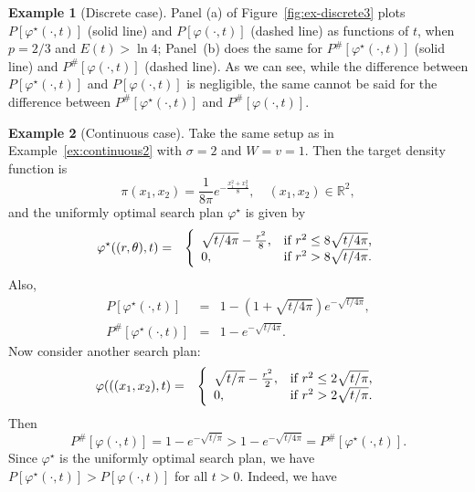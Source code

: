 \documentclass[12pt]{article}
\theoremstyle{plain}
\theoremstyle{definition}
\newtheorem{example}{Example}%
\theoremstyle{remark}
\begin{document}
\begin{example}[Discrete case]
Panel (a) of Figure~\ref{fig:ex-discrete3} plots $P[\varphi^\star(\cdot, t)]$ (solid line) and $P[\varphi(\cdot, t)]$ (dashed line) as functions of $t$, when $p=2/3$ and $E(t)> \ln 4$; Panel~(b) does the same for $P^{\#}[\varphi^\star(\cdot, t)]$ (solid line) and $P^{\#}[\varphi(\cdot, t)]$ (dashed line).  As we can see,  while the difference between $P[\varphi^\star(\cdot, t)]$ and $P[\varphi(\cdot, t)]$ is negligible,  the same cannot be said for the difference between $P^{\#}[\varphi^\star(\cdot, t)]$ and $P^{\#}[\varphi(\cdot, t)]$. 
\end{example}

\bigskip
\begin{example}[Continuous case]

\label{ex:continuous3}
Take the same setup as in Example~\ref{ex:continuous2} with $\sigma=2$ and $W=v=1$. Then the target density function is
\[
\pi(x_1, x_2)=\frac{1}{8\pi}e^{-\frac{x_1^2+x_2^2}{8}}, \quad (x_1, x_2)\in \mathbb{R}^2,
\]
 and the uniformly optimal search plan $\varphi^\star$ is given by 
\begin{eqnarray*}
\varphi^\star((r, \theta), t) &=& \left\{
		                           \begin{array}{ll}
		                           \sqrt{t/4 \pi }-\frac{r^2}{8},& \hbox{if $r^2\leq 8\sqrt{t/4\pi}$,} \\
					0, & \hbox{if $r^2> 8\sqrt{t/4\pi}$.} 
		                          \end{array}
		                         \right.
\end{eqnarray*}
Also, 
\begin{eqnarray*}
P[\varphi^\star(\cdot, t)] &=& 1-(1+\sqrt{t/4\pi})e^{-\sqrt{t/4\pi}}, \\
P^{\#}[\varphi^\star (\cdot, t)] &=& 1-e^{-\sqrt{t/4\pi}}.
\end{eqnarray*}
Now consider another search plan:
\begin{eqnarray*}
\varphi (((x_1, x_2), t) &=&  \left\{
		                           \begin{array}{ll}
		                           \sqrt{t/ \pi }-\frac{r^2}{2},& \hbox{if $r^2\leq 2\sqrt{t/\pi}$,} \\
					0, & \hbox{if $r^2> 2\sqrt{t/\pi}$.} 
		                          \end{array}
		                         \right.
\end{eqnarray*}
Then 
\[
P^{\#}[\varphi (\cdot, t)]=1-e^{-\sqrt{t/\pi}}>1-e^{-\sqrt{t/4\pi}}=P^{\#}[\varphi^\star (\cdot, t)]. 
\]
Since $\varphi^\star$ is the uniformly optimal search plan, we have $P[\varphi^\star(\cdot, t)]>P[\varphi(\cdot, t)]$ for all $t> 0$.  Indeed, we have 

\end{example}
\end{document}
